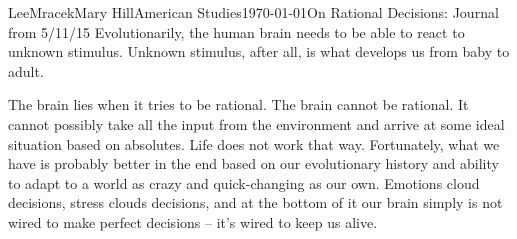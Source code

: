 \documentclass[letterpaper,11pt]{article}
\begin{document}
\begin{mla}{Lee}{Mracek}{Mary Hill}{American Studies}{\today}{On Rational Decisions: Journal from 5/11/15}
Evolutionarily, the human brain needs to be able to react to unknown stimulus. Unknown stimulus, after all, is what develops us from baby to adult.  

The brain lies when it tries to be rational. The brain cannot be rational. It cannot possibly take all the input from the environment and arrive at some ideal situation based on absolutes. Life does not work that way. Fortunately, what we have is probably better in the end based on our evolutionary history and ability to adapt to a world as crazy and quick-changing as our own. Emotions cloud decisions, stress clouds decisions, and at the bottom of it our brain simply is not wired to make perfect decisions -- it's wired to keep us alive.
\end{mla}
\end{document}
